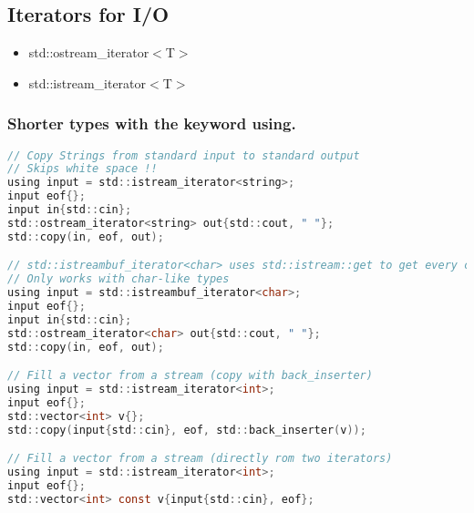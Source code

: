 \subsection{Iterators for I/O}
\begin{itemize}
    \item std::ostream\_iterator$<$T$>$
    \item std::istream\_iterator$<$T$>$
\end{itemize}
\subsubsection{Shorter types with the keyword using.}
\begin{lstlisting}[style=frame, style= linenumbers, language=C]
// Copy Strings from standard input to standard output
// Skips white space !!
using input = std::istream_iterator<string>;
input eof{};
input in{std::cin};
std::ostream_iterator<string> out{std::cout, " "};
std::copy(in, eof, out);

// std::istreambuf_iterator<char> uses std::istream::get to get every character
// Only works with char-like types
using input = std::istreambuf_iterator<char>;
input eof{};
input in{std::cin};
std::ostream_iterator<char> out{std::cout, " "};
std::copy(in, eof, out);

// Fill a vector from a stream (copy with back_inserter)
using input = std::istream_iterator<int>;
input eof{};
std::vector<int> v{};
std::copy(input{std::cin}, eof, std::back_inserter(v));

// Fill a vector from a stream (directly rom two iterators)
using input = std::istream_iterator<int>;
input eof{};
std::vector<int> const v{input{std::cin}, eof};
\end{lstlisting}

